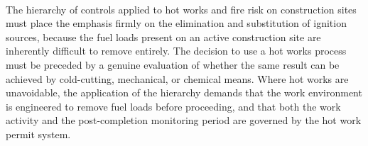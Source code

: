 \paragraph{}
The hierarchy of controls applied to hot works and fire risk on construction sites must place the emphasis firmly on the elimination and substitution of ignition sources, because the fuel loads present on an active construction site are inherently difficult to remove entirely. The decision to use a hot works process must be preceded by a genuine evaluation of whether the same result can be achieved by cold-cutting, mechanical, or chemical means. Where hot works are unavoidable, the application of the hierarchy demands that the work environment is engineered to remove fuel loads before proceeding, and that both the work activity and the post-completion monitoring period are governed by the hot work permit system.


